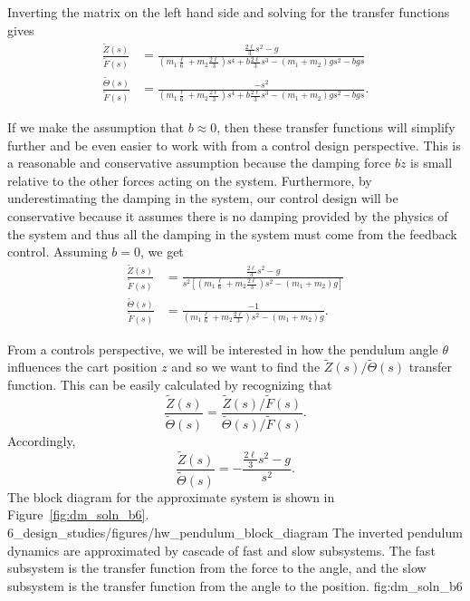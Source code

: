 %
Inverting the matrix on the left hand side and solving for the transfer functions gives
\begin{align*}
\frac{\tilde{Z}(s)}{\tilde{F}(s)} &= \frac{ \frac{2 \ell}{3} s^2 - g}{(m_1 \frac{\ell}{6}+ m_2 \frac{2 \ell}{3}) s^4 +b\frac{2\ell}{3} s^3 -(m_1+m_2)gs^2-bgs} \\
\frac{\tilde{\Theta}(s)}{\tilde{F}(s)} &= \frac{-s^2}{(m_1 \frac{\ell}{6}+ m_2 \frac{2 \ell}{3}) s^4 +b\frac{2\ell}{3} s^3 -(m_1+m_2)gs^2-bgs} .
\end{align*}

If we make the assumption that $b \approx 0$, then these transfer functions will simplify further and be even easier to work with from a control design perspective. This is a reasonable and conservative assumption because the damping force $b\dot{z}$ is small relative to the other forces acting on the system. Furthermore, by underestimating the damping in the system, our control design will be conservative because it assumes there is no damping provided by the physics of the system and thus all the damping in the system must come from the feedback control.
%
Assuming $b=0$, we get
\begin{align*}
\frac{\tilde{Z}(s)}{\tilde{F}(s)} &= \frac{\frac{2 \ell}{3} s^2 - g}{s^2\left[(m_1 \frac{\ell}{6}+ m_2 \frac{2 \ell}{3}) s^2  -(m_1+m_2)g \right]} \\
\frac{\tilde{\Theta}(s)}{\tilde{F}(s)} &= \frac{-1}{(m_1 \frac{\ell}{6}+ m_2 \frac{2 \ell}{3}) s^2  -(m_1+m_2)g}  .
\end{align*}

From a controls perspective, we will be interested in how the pendulum angle $\theta$ influences the cart position $z$ and so we want to find the $\tilde{Z}(s)/\tilde{\Theta}(s)$ transfer function. This can be easily calculated by recognizing that
\[
\frac{\tilde{Z}(s)}{\tilde{\Theta}(s)} = \frac{\tilde{Z}(s)/\tilde{F}(s)}{\tilde{\Theta}(s)/\tilde{F}(s)} .
\]
Accordingly, 
\[
\frac{\tilde{Z}(s)}{\tilde{\Theta}(s)} = -\frac{\frac{2 \ell}{3} s^2 - g}{s^2} .
\]
%
The block diagram for the approximate system is shown in Figure~\ref{fig:dm_soln_b6}.
	{6_design_studies/figures/hw_pendulum_block_diagram}
	{The inverted pendulum dynamics are approximated by cascade of fast and slow subsystems.  The fast subsystem is the transfer function from the force to the angle, and the slow subsystem is the transfer function from the angle to the position.}
	{fig:dm_soln_b6}

